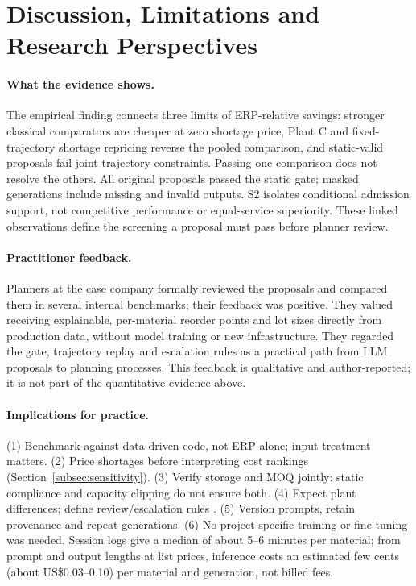 \documentclass[preprint,12pt,nonatbib]{elsarticle}
\let\cite\parencite
\begin{document}
\section{Discussion, Limitations and Research Perspectives}
\label{sec:discussion}

\paragraph{What the evidence shows.}
The empirical finding connects three limits of ERP-relative savings: stronger classical comparators are cheaper at zero shortage price, Plant C and fixed-trajectory shortage repricing reverse the pooled comparison, and static-valid proposals fail joint trajectory constraints. Passing one comparison does not resolve the others. All original proposals passed the static gate; masked generations include missing and invalid outputs. S2 isolates conditional admission support, not competitive performance or equal-service superiority. These linked observations define the screening a proposal must pass before planner review.

\paragraph{Practitioner feedback.} Planners at the case company formally reviewed the proposals and compared them in several internal benchmarks; their feedback was positive. They valued receiving explainable, per-material reorder points and lot sizes directly from production data, without model training or new infrastructure. They regarded the gate, trajectory replay and escalation rules as a practical path from LLM proposals to planning processes. This feedback is qualitative and author-reported; it is not part of the quantitative evidence above.

\paragraph{Implications for practice.}
(1) Benchmark against data-driven code, not ERP alone; input treatment matters. (2) Price shortages before interpreting cost rankings (Section~\ref{subsec:sensitivity}). (3) Verify storage and MOQ jointly: static compliance and capacity clipping do not ensure both. (4) Expect plant differences; define review/escalation rules \cite{parasuraman2010complacency}. (5) Version prompts, retain provenance and repeat generations. (6) No project-specific training or fine-tuning was needed. Session logs give a median of about 5--6 minutes per material; from prompt and output lengths at list prices, inference costs an estimated few cents (about US\$0.03--0.10) per material and generation, not billed fees.
\end{document}
